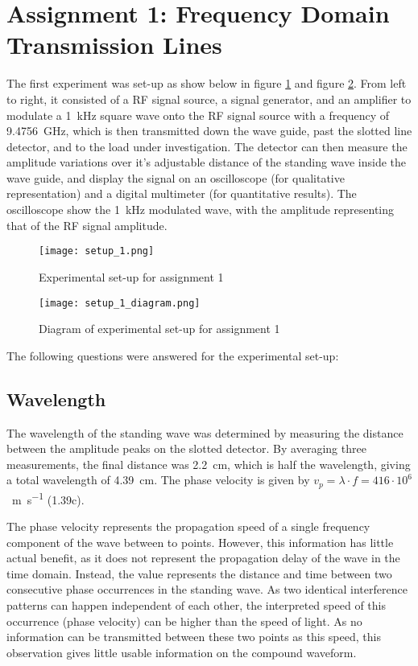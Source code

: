 \section*{Assignment 1: Frequency Domain Transmission Lines}

The first experiment was set-up as show below in figure \ref{fig:setup_1} and figure \ref{fig:setup_1_diagram}. From left to right, it consisted of a RF signal source, a signal generator, and an amplifier to modulate a \SI{1}{\kilo\hertz} square wave onto the RF signal source with a frequency of \SI{9.4756}{\giga\hertz}, which is then transmitted down the wave guide, past the slotted line detector, and to the load under investigation. The detector can then measure the amplitude variations over it's adjustable distance of the standing wave inside the wave guide, and display the signal on an oscilloscope (for qualitative representation) and a digital multimeter (for quantitative results). The oscilloscope show the \SI{1}{\kilo\hertz} modulated wave, with the amplitude representing that of the RF signal amplitude.

\begin{figure}[H]
	\centering
	\texttt{[image: setup\_1.png]}
	\label{fig:setup_1}
	\caption{Experimental set-up for assignment 1 \cite[p.3]{lab_manual}}
\end{figure}

\begin{figure}[H]
	\centering
	\texttt{[image: setup\_1\_diagram.png]}
	\label{fig:setup_1_diagram}
	\caption{Diagram of experimental set-up for assignment 1}
\end{figure}

The following questions were answered for the experimental set-up:

\subsection*{Wavelength}
The wavelength of the standing wave was determined by measuring the distance between the amplitude peaks on the slotted detector. By averaging three measurements, the final distance was \SI{2.2}{\centi\meter}, which is half the wavelength, giving a total wavelength of \SI{4.39}{\centi\meter}. The phase velocity is given by $v_{p} = \lambda \cdot f = 416 \cdot 10^6$ \SI {}{\meter\per\second} (1.39c).

The phase velocity represents the propagation speed of a single frequency component of the wave between to points. However, this information has little actual benefit, as it does not represent the propagation delay of the wave in the time domain. Instead, the value represents the distance and time between two consecutive phase occurrences in the standing wave. As two identical interference patterns can happen independent of each other, the interpreted speed of this occurrence (phase velocity) can be higher than the speed of light. As no information can be transmitted between these two points as this speed, this observation gives little usable information on the compound waveform.

